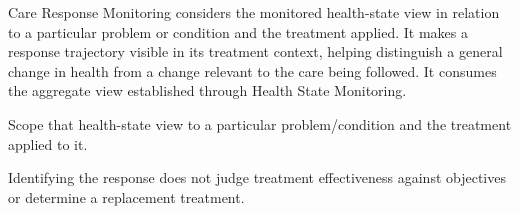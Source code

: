 Care Response Monitoring considers the monitored health-state view in relation to a particular problem or condition and the treatment applied. It makes a response trajectory visible in its treatment context, helping distinguish a general change in health from a change relevant to the care being followed. It consumes the aggregate view established through Health State Monitoring.



Scope that health-state view to a particular problem/\allowbreak{}condition and the treatment applied to it.



Identifying the response does not judge treatment effectiveness against objectives or determine a replacement treatment.


